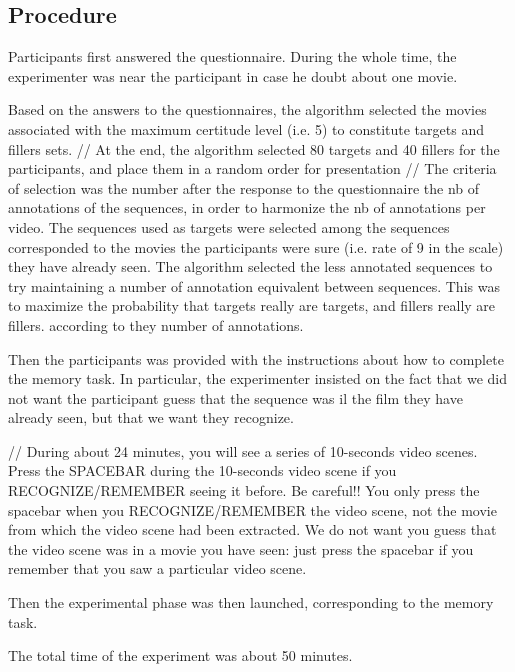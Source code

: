 \documentclass[sigconf]{acmart}
\begin{document}
\subsection{Procedure}
Participants first answered the questionnaire. During the whole time, the experimenter was near the participant in case he doubt about one movie. 

Based on the answers to the questionnaires, the algorithm selected the movies associated with the maximum certitude level (i.e. 5) to constitute  targets and fillers sets. // At the end, the algorithm selected 80 targets and 40 fillers for the participants, and place them in a random order for presentation
// The criteria of selection was the number after the response to the questionnaire the nb of annotations of the sequences, in order to harmonize the nb of annotations per video.
The sequences used as targets were selected among the sequences corresponded to the movies the participants were sure (i.e. rate of 9 in the scale) they have already seen. The algorithm selected the less annotated sequences to try maintaining a number of annotation equivalent between sequences.
This was to maximize the probability that targets really are targets, and fillers really are fillers. according to they number of annotations.


Then the participants was provided with the instructions about how to complete the memory task. In particular, the experimenter insisted on the fact that we did not want the participant guess that the sequence was il the film they have already seen, but that we want they recognize.

// During about 24 minutes, you will see a series of 10-seconds video scenes. Press the SPACEBAR during the 10-seconds video scene if you RECOGNIZE/REMEMBER seeing it before. Be careful!! You only press the spacebar when you RECOGNIZE/REMEMBER the video scene, not the movie from which the video scene had been extracted. We do not want you guess that the video scene was in a movie you have seen: just press the spacebar if you remember that you saw a particular video scene.

Then the experimental phase was then launched, corresponding to the memory task.

The total time of the experiment was about 50 minutes.
\end{document}
